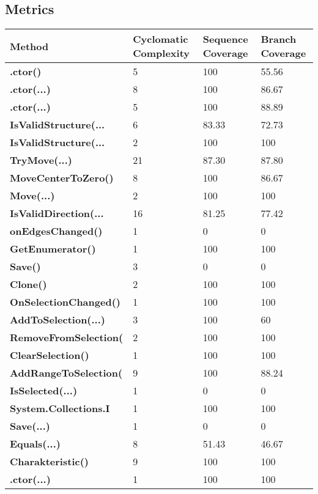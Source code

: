 \documentclass[a4paper,10pt]{article}
\begin{document}
\subsection{Metrics}
\begin{longtable}[l]{|l|l|l|l|}
\hline
\textbf{Method} & \textbf{Cyclomatic Complexity} & \textbf{Sequence Coverage} & \textbf{Branch Coverage}\\
\hline
\textbf{.ctor()} & 5 & 100 & 55.56\\
\hline
\textbf{.ctor(...)} & 8 & 100 & 86.67\\
\hline
\textbf{.ctor(...)} & 5 & 100 & 88.89\\
\hline
\textbf{IsValidStructure(...} & 6 & 83.33 & 72.73\\
\hline
\textbf{IsValidStructure(...} & 2 & 100 & 100\\
\hline
\textbf{TryMove(...)} & 21 & 87.30 & 87.80\\
\hline
\textbf{MoveCenterToZero()} & 8 & 100 & 86.67\\
\hline
\textbf{Move(...)} & 2 & 100 & 100\\
\hline
\textbf{IsValidDirection(...} & 16 & 81.25 & 77.42\\
\hline
\textbf{onEdgesChanged()} & 1 & 0 & 0\\
\hline
\textbf{GetEnumerator()} & 1 & 100 & 100\\
\hline
\textbf{Save()} & 3 & 0 & 0\\
\hline
\textbf{Clone()} & 2 & 100 & 100\\
\hline
\textbf{OnSelectionChanged()} & 1 & 100 & 100\\
\hline
\textbf{AddToSelection(...)} & 3 & 100 & 60\\
\hline
\textbf{RemoveFromSelection(} & 2 & 100 & 100\\
\hline
\textbf{ClearSelection()} & 1 & 100 & 100\\
\hline
\textbf{AddRangeToSelection(} & 9 & 100 & 88.24\\
\hline
\textbf{IsSelected(...)} & 1 & 0 & 0\\
\hline
\textbf{System.Collections.I} & 1 & 100 & 100\\
\hline
\textbf{Save(...)} & 1 & 0 & 0\\
\hline
\textbf{Equals(...)} & 8 & 51.43 & 46.67\\
\hline
\textbf{Charakteristic()} & 9 & 100 & 100\\
\hline
\textbf{.ctor(...)} & 1 & 100 & 100\\
\hline
\end{longtable}
\end{document}
